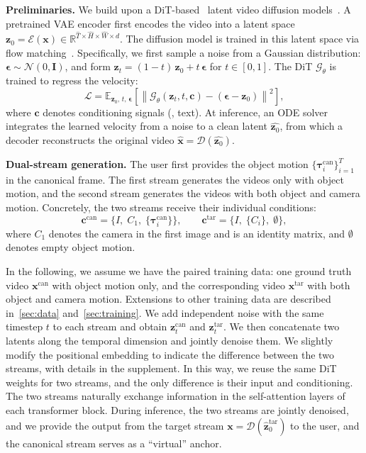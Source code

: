\noindent\textbf{Preliminaries.}\quad
We build upon a DiT-based~\cite{peebles2023scalable} latent video diffusion models~\cite{agarwal2025cosmos,wan2025wan}.
A pretrained VAE encoder first encodes the video into a latent space
$\mathbf{z}_0 = \mathcal{E}(\mathbf{x}) \in \mathbb{R}^{\hat{T} \times
\hat{H} \times \hat{W} \times d}$.
The diffusion model is trained in this latent space via flow matching~\cite{lipman2022flow}. Specifically, we first sample a noise from a Gaussian distribution: $\boldsymbol{\epsilon} \sim \mathcal{N}(0,\mathbf{I})$, and form $\mathbf{z}_t = (1{-}t)\,\mathbf{z}_0 + t\,\boldsymbol{\epsilon}$ for $t \in [0,1]$. The DiT $\mathcal{G}_\theta$  is trained to regress the velocity:
\begin{equation}
    \mathcal{L} = \mathbb{E}_{\mathbf{z}_0,\, t,\, \boldsymbol{\epsilon}} \left[\left\| \mathcal{G}_\theta(\mathbf{z}_t, t, \mathbf{c}) - (\boldsymbol{\epsilon} - \mathbf{z}_0) \right\|^2 \right],
    \label{eq:flow_matching}
\end{equation}
where $\mathbf{c}$ denotes conditioning signals (\eg, text).
At inference, an ODE solver~\cite{zhao2023unipc} integrates the learned
velocity from a noise to a clean latent $\hat{\mathbf{z}_0}$,  from which a decoder reconstructs the original video $\hat{\mathbf{x}} = \mathcal{D}(\hat{\mathbf{z}_0})$.

\noindent\textbf{Dual-stream generation.}\quad
The user first provides the object motion $\{\boldsymbol{\tau}^{\text{can}}_i\}_{i=1}^T$ in the canonical frame. The first stream generates the videos only with object motion, and the second stream generates the videos with both object and camera motion.
Concretely, the two streams receive their individual conditions:
\begin{equation*}
  \mathbf{c}^{\text{can}} = \bigl\{
    I,\; C_1,\; \{\boldsymbol{\tau}^{\text{can}}_i\}
  \bigr\},
  \qquad
  \mathbf{c}^{\text{tar}} = \bigl\{
    I,\; \{C_i\},\; \emptyset
  \bigr\},
\end{equation*}
where $C_1$ denotes the camera in the first image and is an identity matrix,  and $\emptyset$ denotes empty object motion.

In the following, we assume we have the paired training data: one ground truth video $\mathbf{x}^{\text{can}}$  with object motion only, and the corresponding video $\mathbf{x}^{\text{tar}}$ with both object and camera motion. Extensions to other training data are described in~\cref{sec:data} and~\cref{sec:training}.
We add independent noise with the same timestep $t$ to each stream and obtain $\mathbf{z}^{\text{can}}_t$ and $\mathbf{z}^{\text{tar}}_t$.
We then concatenate two latents along the temporal
dimension and jointly denoise them.
We slightly modify the positional embedding to indicate the difference between the two streams, with details in the supplement.
In this way, we reuse the same DiT weights for two streams, and the only difference is their input and conditioning. The two streams naturally exchange information in the self-attention layers of each transformer block.
During inference, the two streams are jointly denoised, and we provide the output from the target stream  $\mathbf{x}=
\mathcal{D}(\hat{\mathbf{z}}^{\text{tar}}_0)$ to the user, and the canonical stream serves as a ``virtual'' anchor.

